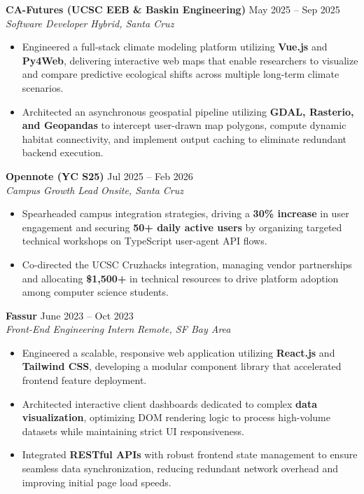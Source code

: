 \documentclass[a4paper,10pt]{extarticle}
\begin{document}
    \noindent
    \textbf{CA-Futures (UCSC EEB \& Baskin Engineering)} \hfill May 2025 -- Sep 2025 \\
    \textit{Software Developer} \hfill \textit{Hybrid, Santa Cruz}
    \begin{itemize}[leftmargin=0.2in,]
        \item Engineered a full-stack climate modeling platform utilizing \textbf{Vue.js} and \textbf{Py4Web}, delivering interactive web maps that enable researchers to visualize and compare predictive ecological shifts across multiple long-term climate scenarios.
        \item Architected an asynchronous geospatial pipeline utilizing \textbf{GDAL, Rasterio, and Geopandas} to intercept user-drawn map polygons, compute dynamic habitat connectivity, and implement output caching to eliminate redundant backend execution.
    \end{itemize}
    \vspace{5pt}

    \noindent
    \textbf{Opennote (YC S25)} \hfill Jul 2025 -- Feb 2026 \\
    \textit{Campus Growth Lead} \hfill \textit{Onsite, Santa Cruz}
    \begin{itemize}[leftmargin=0.2in,]
        \item Spearheaded campus integration strategies, driving a \textbf{30\% increase} in user engagement and securing \textbf{50+ daily active users} by organizing targeted technical workshops on TypeScript user-agent API flows.
        \item Co-directed the UCSC Cruzhacks integration, managing vendor partnerships and allocating \textbf{\$1,500+} in technical resources to drive platform adoption among computer science students.
    \end{itemize}
    \vspace{5pt}

    \noindent
    \textbf{Fassur} \hfill June 2023 -- Oct 2023 \\
    \textit{Front-End Engineering Intern} \hfill \textit{Remote, SF Bay Area}
    \begin{itemize}[leftmargin=0.2in,]
        \item Engineered a scalable, responsive web application utilizing \textbf{React.js} and \textbf{Tailwind CSS}, developing a modular component library that accelerated frontend feature deployment.
        \item Architected interactive client dashboards dedicated to complex \textbf{data visualization}, optimizing DOM rendering logic to process high-volume datasets while maintaining strict UI responsiveness.
        \item Integrated \textbf{RESTful APIs} with robust frontend state management to ensure seamless data synchronization, reducing redundant network overhead and improving initial page load speeds.
    \end{itemize}
\end{document}
